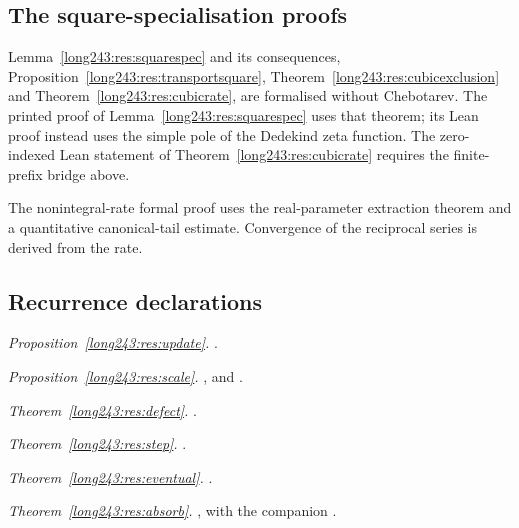 \documentclass[11pt]{article}
\begin{document}
\subsection*{The square-specialisation proofs}
Lemma~\ref{long243:res:squarespec} and its consequences,
Proposition~\ref{long243:res:transportsquare},
Theorem~\ref{long243:res:cubicexclusion} and
Theorem~\ref{long243:res:cubicrate}, are formalised without Chebotarev.
The printed proof of Lemma~\ref{long243:res:squarespec} uses that theorem;
its Lean proof instead uses the simple pole of the Dedekind zeta function.
The zero-indexed Lean statement of Theorem~\ref{long243:res:cubicrate}
requires the finite-prefix bridge above.

The nonintegral-rate formal proof uses the real-parameter extraction
theorem and a quantitative canonical-tail estimate. Convergence of the
reciprocal series is derived from the rate.

\subsection*{Recurrence declarations}
\noindent\emph{Proposition~\ref{long243:res:update}.} .

\noindent\emph{Proposition~\ref{long243:res:scale}.} ,
and
.

\noindent\emph{Theorem~\ref{long243:res:defect}.} .

\noindent\emph{Theorem~\ref{long243:res:step}.} .

\noindent\emph{Theorem~\ref{long243:res:eventual}.} .

\noindent\emph{Theorem~\ref{long243:res:absorb}.} , with the companion
.
\end{document}

